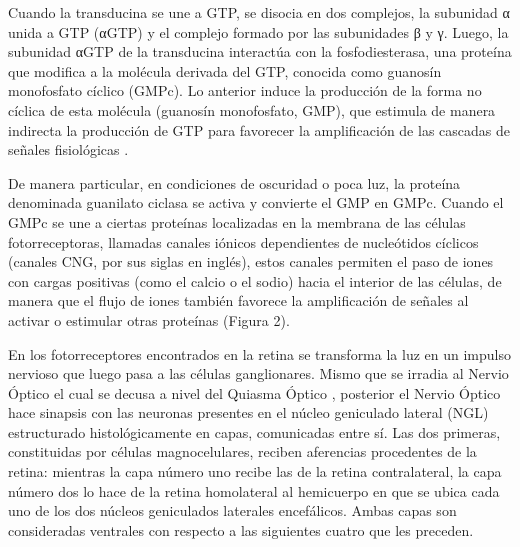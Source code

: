 \documentclass[10pt]{article}
\begin{document}
\setlength{\parskip}{2mm}

Cuando la transducina se une a GTP, se disocia en dos complejos, la subunidad α unida a GTP
(αGTP) y el complejo formado por las subunidades β y γ. Luego, la subunidad αGTP de la transducina interactúa con la fosfodiesterasa, una proteína que modifica a la molécula derivada del GTP, conocida como guanosín monofosfato cíclico (GMPc). Lo anterior induce la producción de la forma no cíclica de esta molécula (guanosín monofosfato, GMP), que estimula de manera indirecta la producción de GTP para favorecer la amplificación de las cascadas de señales fisiológicas \cite{IEEEreferencias:Ref12}.

\setlength{\parskip}{2mm}

De manera particular, en condiciones de oscuridad o poca luz, la proteína denominada guanilato ciclasa se activa y convierte el GMP en GMPc. Cuando el GMPc se une a ciertas proteínas localizadas en la membrana de las células fotorreceptoras, llamadas canales iónicos dependientes de nucleótidos cíclicos (canales CNG, por sus siglas en inglés), estos canales permiten el paso de iones con cargas positivas (como el calcio o el sodio) hacia el interior de las células, de manera que el flujo de iones también favorece la amplificación de señales al activar o estimular otras proteínas \cite{IEEEreferencias:Ref12} (Figura 2).

\setlength{\parskip}{2mm}

En los fotorreceptores encontrados en la retina se transforma la luz en un impulso nervioso que luego pasa a las células ganglionares.  Mismo que se irradia al Nervio Óptico el cual se decusa a nivel del Quiasma Óptico \cite{IEEEreferencias:Ref14}, posterior el Nervio Óptico hace sinapsis con las neuronas presentes en el núcleo geniculado lateral (NGL) estructurado histológicamente en capas, comunicadas entre sí. Las dos primeras, constituidas por células magnocelulares, reciben aferencias procedentes de la retina: mientras la capa número uno recibe las de la retina contralateral, la capa número dos lo hace de la retina homolateral al hemicuerpo en que se ubica cada uno de los dos núcleos geniculados laterales encefálicos. Ambas capas son consideradas ventrales con respecto a las siguientes cuatro que les preceden\cite{IEEEreferencias:Ref15}.

\setlength{\parskip}{2mm}
\end{document}
